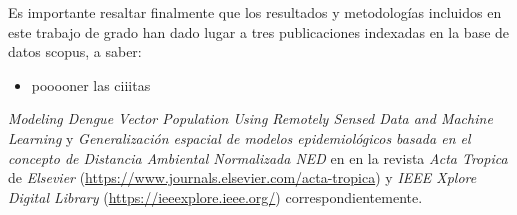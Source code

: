   \par Es importante resaltar finalmente que los resultados y metodologías
    incluidos en este trabajo de grado han dado lugar a tres publicaciones
    indexadas en la base de datos scopus, a saber:

    \begin{itemize}
      \item pooooner las ciiitas
    \end{itemize}
    \textit{Modeling Dengue Vector Population Using Remotely Sensed Data and
    Machine Learning} \cite{scavuzzo2018modeling} y
    \textit{Generalización espacial de modelos epidemiológicos basada en el
    concepto de Distancia Ambiental Normalizada NED} en
    en la revista \textit{Acta Tropica}
    de \textit{Elsevier} (\url{https://www.journals.elsevier.com/acta-tropica})
    y \textit{IEEE Xplore Digital Library} (\url{https://ieeexplore.ieee.org/})
    correspondientemente.

